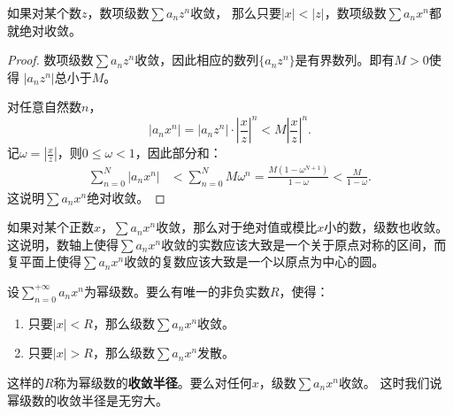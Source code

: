 \documentclass[12pt,UTF8]{ctexbook}
\begin{document}
\begin{tm}\label{tm:1-1-0}
    如果对某个数$z$，数项级数$\sum a_n z^n$收敛，
    那么只要$|x|<|z|$，数项级数$\sum a_n x^n$都就绝对收敛。
\end{tm}

\begin{proof}
    数项级数$\sum a_n z^n$收敛，因此相应的数列$\{a_n z^n\}$是有界数列。即有$M>0$使得
    $|a_n z^n|$总小于$M$。

    对任意自然数$n$，
    $$ |a_n x^n| = |a_n z^n| \cdot \left|\frac{x}{z}\right|^n < M \left|\frac{x}{z}\right|^n. $$
    记$\displaystyle \omega = \left|\frac{x}{z}\right|$，则$0\leqslant \omega<1$，因此部分和：
    \begin{align*}
        \sum_{n=0}^N |a_n x^n| &< \sum_{n=0}^N M \omega^n = \frac{M(1 - \omega^{N+1})}{1 - \omega} < \frac{M}{1 - \omega}.
    \end{align*}
    这说明$\sum a_n x^n$绝对收敛。

\end{proof}

如果对某个正数$x$，$\sum a_n x^n$收敛，那么对于绝对值或模比$x$小的数，级数也收敛。
这说明，数轴上使得$\sum a_n x^n$收敛的实数应该大致是一个关于原点对称的区间，而复平面上使得$\sum a_n x^n$收敛的复数应该大致是一个以原点为中心的圆。

\begin{tm}\label{tm:3-1-10}
    设$\displaystyle\sum_{n=0}^{+\infty} a_n x^n$为幂级数。要么有唯一的非负实数$R$，使得：
    \begin{enumerate}
        \item 只要$|x|<R$，那么级数$\sum a_n x^n$收敛。
        \item 只要$|x|>R$，那么级数$\sum a_n x^n$发散。
    \end{enumerate}
    这样的$R$称为幂级数的\textbf{收敛半径}。要么对任何$x$，级数$\sum a_n x^n$收敛。
    这时我们说幂级数的收敛半径是无穷大。
\end{tm}
\end{document}
